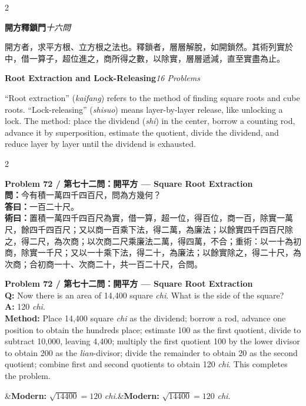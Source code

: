 \documentclass[11pt,a4paper]{article}
\newcommand{\bilingualproblem}[4]{%
  \begin{paracol}{2}
  \begin{leftcolumn}
  \noindent\textbf{\color{problemcolor}#1}\\[0.2cm]
  #2
  \end{leftcolumn}
  \switchcolumn
  \noindent\textbf{\color{problemcolor}#1}\\[0.2cm]
  #3
  \end{paracol}
  \ifx&#4&\else\vspace{0.3cm}\noindent#4\fi
  \vspace{0.5cm}
}
\newcommand{\wen}[1]{\textcolor{problemcolor}{\textbf{問：}}#1}
\newcommand{\da}[1]{\textcolor{answercolor}{\textbf{答曰：}}#1}
\newcommand{\shu}[1]{\textcolor{methodcolor}{\textbf{術曰：}}#1}
\newcommand{\wenen}[1]{\textcolor{problemcolor}{\textbf{Q:}} #1}
\newcommand{\daen}[1]{\textcolor{answercolor}{\textbf{A:}} #1}
\newcommand{\shuen}[1]{\textcolor{methodcolor}{\textbf{Method:}} #1}
\begin{document}
\begin{paracol}{2}
\begin{leftcolumn}
\noindent\textbf{開方釋鎖門}\quad\textit{十六問}

開方者，求平方根、立方根之法也。釋鎖者，層層解脫，如開鎖然。其術列實於中，借一算子，超位進之，商所得之數，以除實，層層遞減，直至實盡為止。
\end{leftcolumn}

\switchcolumn

\noindent\textbf{Root Extraction and Lock-Releasing}\quad\textit{16 Problems}

``Root extraction'' (\textit{kaifang}) refers to the method of finding square roots and cube roots. ``Lock-releasing'' (\textit{shisuo}) means layer-by-layer release, like unlocking a lock. The method: place the dividend (\textit{shi}) in the center, borrow a counting rod, advance it by superposition, estimate the quotient, divide the dividend, and reduce layer by layer until the dividend is exhausted.
\end{paracol}

\vspace{0.5cm}

\bilingualproblem{Problem 72 / 第七十二問：開平方 --- Square Root Extraction}{
\wen{今有積一萬四千四百尺，問為方幾何？}\\[0.2cm]
\da{一百二十尺。}\\[0.2cm]
\shu{置積一萬四千四百尺為實，借一算，超一位，得百位，商一百，除實一萬尺，餘四千四百尺；又以商一百乘下法，得二萬，為廉法；以餘實四千四百尺除之，得二尺，為次商；以次商二尺乘廉法二萬，得四萬，不合；重術：以一十為初商，除實一千尺；又以一十乘下法，得二十，為廉法；以餘實除之，得二十尺，為次商；合初商一十、次商二十，共一百二十尺，合問。}
}{
\wenen{Now there is an area of 14,400 square \textit{chi}. What is the side of the square?}\\[0.2cm]
\daen{120 \textit{chi}.}\\[0.2cm]
\shuen{Place 14,400 square \textit{chi} as the dividend; borrow a rod, advance one position to obtain the hundreds place; estimate 100 as the first quotient, divide to subtract 10,000, leaving 4,400; multiply the first quotient 100 by the lower divisor to obtain 200 as the \textit{lian}-divisor; divide the remainder to obtain 20 as the second quotient; combine first and second quotients to obtain 120 \textit{chi}. This completes the problem.}
}{\textbf{Modern:} $\sqrt{14400} = 120$ \textit{chi}.}
\end{document}
